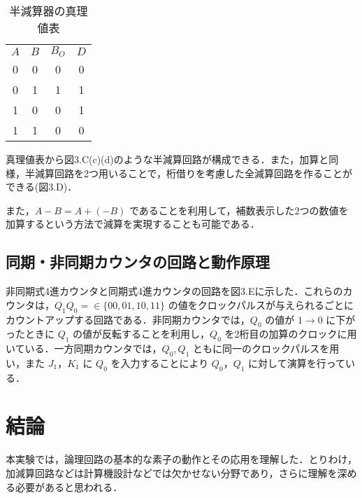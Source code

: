 \begin{table}[!h]
    \caption{半減算器の真理値表}
    \label{tbl04}
    \begin{center}
        \begin{tabular}{|c|c||c|c|}
            \hline
            $A$ & $B$ & $B_O$ & $D$ \\
            \hhline{|=|=#=|=|}
            0   & 0   & 0     & 0   \\
            \hline
            0   & 1   & 1     & 1   \\
            \hline
            1   & 0   & 0     & 1   \\
            \hline
            1   & 1   & 0     & 0   \\
            \hline
        \end{tabular}
    \end{center}
\end{table}

真理値表から図3.C(c)(d)のような半減算回路が構成できる．また，加算と同様，半減算回路を2つ用いることで，桁借りを考慮した全減算回路を作ることができる(図3.D)．

また，$A - B = A + (-B)$ であることを利用して，補数表示した2つの数値を加算するという方法で減算を実現することも可能である．

\newpage
\subsection{同期・非同期カウンタの回路と動作原理}

非同期式4進カウンタと同期式4進カウンタの回路を図3.Eに示した．これらのカウンタは，$Q_1 Q_0 = \in \{ 00, 01, 10, 11 \}$ の値をクロックパルスが与えられるごとにカウントアップする回路である．非同期カウンタでは，$Q_0$ の値が $1 \rightarrow 0$ に下がったときに $Q_1$ の値が反転することを利用し，$Q_0$ を2桁目の加算のクロックに用いている．一方同期カウンタでは，$Q_0, Q_1$ ともに同一のクロックパルスを用い，また $J_1$，$K_1$ に $Q_0$ を入力することにより $Q_0$，$Q_1$ に対して演算を行っている．

\section{結論}

本実験では，論理回路の基本的な素子の動作とその応用を理解した．とりわけ，加減算回路などは計算機設計などでは欠かせない分野であり，さらに理解を深める必要があると思われる．


